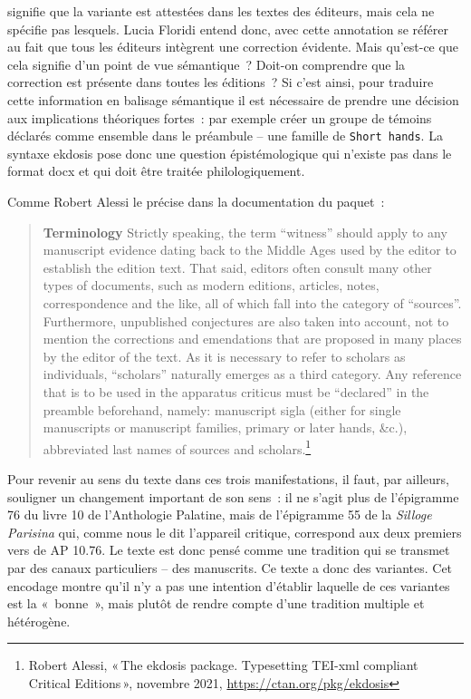 signifie que la variante est attestées dans les textes des éditeurs,
mais cela ne spécifie pas lesquels. Lucia Floridi entend donc, avec
cette annotation se référer au fait que tous les éditeurs intègrent une
correction évidente. Mais qu'est-ce que cela signifie d'un point de vue
sémantique~? Doit-on comprendre que la correction est présente dans
toutes les éditions~? Si c'est ainsi, pour traduire cette information en
balisage sémantique il est nécessaire de prendre une décision aux
implications théoriques fortes~: par exemple créer un groupe de témoins
déclarés comme ensemble dans le préambule -- une famille de
\texttt{Short\ hands}. La syntaxe ekdosis pose donc une question
épistémologique qui n'existe pas dans le format docx et qui doit être
traitée philologiquement.

Comme Robert Alessi le précise dans la documentation du paquet~:

\begin{quote}
\textbf{Terminology} Strictly speaking, the term ``witness'' should
apply to any manuscript evidence dating back to the Middle Ages used by
the editor to establish the edition text. That said, editors often
consult many other types of documents, such as modern editions,
articles, notes, correspondence and the like, all of which fall into the
category of ``sources''. Furthermore, unpublished conjectures are also
taken into account, not to mention the corrections and emendations that
are proposed in many places by the editor of the text. As it is
necessary to refer to scholars as individuals, ``scholars'' naturally
emerges as a third category. Any reference that is to be used in the
apparatus criticus must be ``declared'' in the preamble beforehand,
namely: manuscript sigla (either for single manuscripts or manuscript
families, primary or later hands, \&c.), abbreviated last names of
sources and scholars.\footnote{Robert Alessi, {«\,The ekdosis package.
  {Typesetting} {TEI}-xml compliant {Critical} {Editions}\,»}, novembre
  2021, \url{https://ctan.org/pkg/ekdosis}}
\end{quote}

Pour revenir au sens du texte dans ces trois manifestations, il faut,
par ailleurs, souligner un changement important de son sens~: il ne
s'agit plus de l'épigramme 76 du livre 10 de l'Anthologie Palatine, mais
de l'épigramme 55 de la \emph{Silloge Parisina} qui, comme nous le dit
l'appareil critique, correspond aux deux premiers vers de AP 10.76. Le
texte est donc pensé comme une tradition qui se transmet par des canaux
particuliers -- des manuscrits. Ce texte a donc des variantes. Cet
encodage montre qu'il n'y a pas une intention d'établir laquelle de ces
variantes est la «~bonne~», mais plutôt de rendre compte d'une tradition
multiple et hétérogène.

